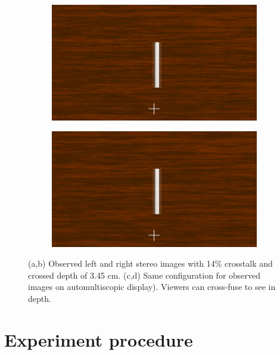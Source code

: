 \begin{figure}[htbp]
    \begin{subfigure}[b]{0.5\textwidth}
        \includegraphics[width=\textwidth]{./Template_Figures/auto_ghost_left}
        \caption{}\label{fig:obs_aut_left}
    \end{subfigure}
    \begin{subfigure}[b]{0.5\textwidth}
        \includegraphics[width=\textwidth]{./Template_Figures/auto_ghost_left}
        \caption{}\label{fig:obs_aut_right}
    \end{subfigure}
    \caption{(a,b) Observed left and right stereo images with 14\% crosstalk and crossed depth of 3.45 cm. (c,d) Same configuration for observed images on automultiscopic display). Viewers can cross-fuse to see in depth.\label{fig:observed_ct_images}}
\end{figure}

\section{Experiment procedure}
